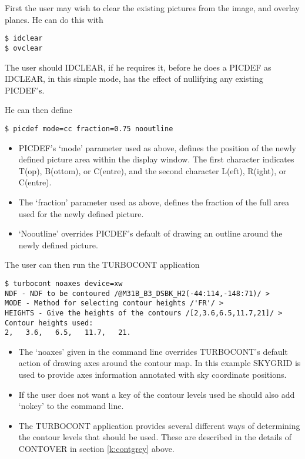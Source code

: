 \documentclass[twoside,11pt]{article}
\begin{document}
First the user may wish to clear the existing pictures from the image, and
overlay planes. He can do this with
\begin{small}
\begin{verbatim}
$ idclear 
$ ovclear
\end{verbatim}
\end{small}
The user should IDCLEAR, if he requires it, before he does a PICDEF as IDCLEAR,
in this simple mode, has the effect of nullifying any existing PICDEF's. 

He can then define 
\begin{small}
\begin{verbatim}
$ picdef mode=cc fraction=0.75 nooutline
\end{verbatim}
\end{small}
\begin{itemize}
\item PICDEF's `mode' parameter used as above, defines the position of the newly
defined picture area within the display window. The first character indicates
T(op), B(ottom), or C(entre), and the second character L(eft), R(ight), or
C(entre).
\item The `fraction' parameter used as above, defines the fraction of the full
area used for the newly defined picture.
\item `Nooutline' overrides PICDEF's default of drawing an outline around the
newly defined picture.
\end{itemize}

The user can then run the TURBOCONT application 

\begin{small}
\begin{verbatim}
$ turbocont noaxes device=xw
NDF - NDF to be contoured /@M31B_B3_DSBK_H2(-44:114,-148:71)/ > 
MODE - Method for selecting contour heights /'FR'/ > 
HEIGHTS - Give the heights of the contours /[2,3.6,6.5,11.7,21]/ > 
Contour heights used:
2,   3.6,   6.5,   11.7,   21.
\end{verbatim}
\end{small}
\begin{itemize}
\item The `noaxes' given in the command line overrides TURBOCONT's default
action of drawing axes around the contour map. In this example SKYGRID is used
to provide axes information annotated with sky coordinate positions.
\item If the user does not want a key of the contour levels used he should also
add `nokey' to the command line.
\item The TURBOCONT application provides several different ways of determining
the contour levels that should be used. These are described in the details of
CONTOVER in section \ref{k:contgrey} above.
\end{itemize}
\end{document}
